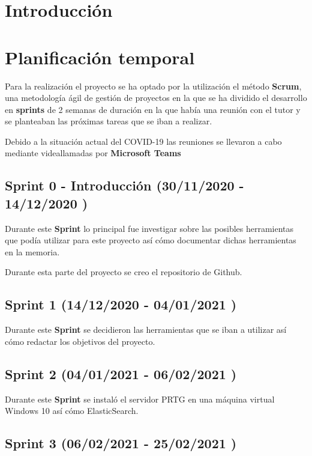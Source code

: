 
\section{Introducción}

\section{Planificación temporal}

Para la realización el proyecto se ha optado por la utilización el método \textbf{Scrum}, una metodología ágil de gestión de proyectos en la  que se ha dividido el desarrollo en \textbf{sprints} de 2 semanas de duración en la que había una reunión con el tutor y se planteaban las próximas tareas que se iban a realizar.

Debido a la situación actual del COVID-19 las reuniones se llevaron a cabo mediante videallamadas por \textbf{Microsoft Teams}

\subsection{Sprint 0 - Introducción (30/11/2020 - 14/12/2020 )}

Durante este \textbf{Sprint} lo principal fue investigar sobre las posibles herramientas que podía utilizar para este proyecto así cómo documentar dichas herramientas en la memoria.

Durante esta parte del proyecto se creo el repositorio de Github.

\subsection{Sprint 1   (14/12/2020 - 04/01/2021 )}

Durante este \textbf{Sprint} se decidieron las herramientas que se iban a utilizar así cómo redactar los objetivos del proyecto.

\subsection{Sprint 2   (04/01/2021 - 06/02/2021 )}

Durante este \textbf{Sprint} se instaló el servidor PRTG en una máquina virtual Windows 10 así cómo ElasticSearch. 

\subsection{Sprint 3   (06/02/2021 - 25/02/2021 )}

